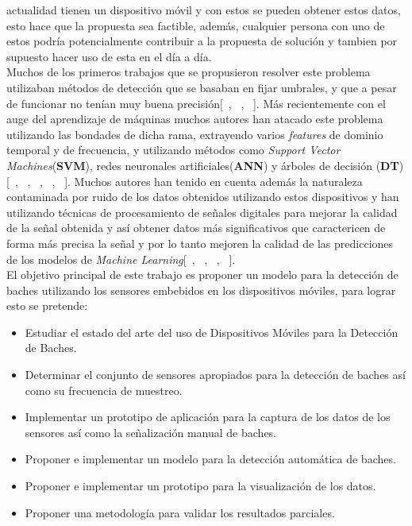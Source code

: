 actualidad tienen un dispositivo móvil y con estos se pueden obtener estos datos, esto hace que la propuesta sea factible, además,
cualquier persona con uno de estos podría potencialmente contribuir a la propuesta de solución y tambien por supuesto hacer uso de
esta en el día a día.\\ 
\indent Muchos de los primeros trabajos que se propusieron resolver este problema utilizaban métodos de detección que se basaban en fijar
umbrales, y que a pesar de funcionar no tenían muy buena precisión[~\parencite{eriksson2008pothole}, ~\parencite{mohan2008nericell},
~\parencite{mednis2011real}]. Más recientemente con el auge del aprendizaje de máquinas muchos autores han atacado este problema
utilizando las bondades de dicha rama, extrayendo varios \emph{features} de dominio temporal y de frecuencia, y utilizando métodos
como \emph{Support Vector Machines}(\textbf{SVM}), redes neuronales artificiales(\textbf{ANN}) y árboles de decisión (\textbf{DT})
[~\parencite{el2018towards}, ~\parencite{seraj2015roads}, ~\parencite{gonzalez2017learning}, ~\parencite{zheng2020fused},
~\parencite{perttunen2011distributed}]. Muchos autores han tenido en cuenta además la naturaleza contaminada por ruido de los datos
obtenidos utilizando estos dispositivos y han utilizando técnicas de procesamiento de señales digitales para mejorar la calidad de
la señal obtenida y así obtener datos más significativos que caractericen de forma más precisa la señal y por lo tanto mejoren la
calidad de las predicciones de los modelos de \emph{Machine Learning}[~\parencite{el2018towards}, ~\parencite{zheng2020fused},
~\parencite{perttunen2011distributed}, ~\parencite{gonzalez2017learning}].\\
\indent El objetivo principal de este trabajo es proponer un modelo para la detección de baches utilizando los sensores embebidos en los
dispositivos móviles, para lograr esto se pretende:

\begin{itemize}
	\item Estudiar el estado del arte del uso de Dispositivos Móviles para la Detección de Baches.
	\item Determinar el conjunto de sensores apropiados para la detección de baches así como su frecuencia de muestreo.
	\item Implementar un prototipo de aplicación para la captura de los datos de los sensores así como la señalización
		manual de baches.
	\item Proponer e implementar un modelo para la detección automática de baches.
	\item Proponer e implementar un prototipo para la visualización de los datos.
	\item Proponer una metodología para validar los resultados parciales.
\end{itemize}
